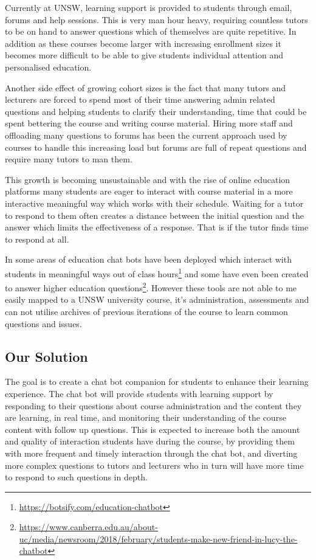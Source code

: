 \documentclass{article}
\begin{document}
Currently at UNSW, learning support is provided to students through email, forums and help sessions. This is very man hour heavy, requiring countless tutors to be on hand to answer questions which of themselves are quite repetitive. In addition as these courses become larger with increasing enrollment sizes it becomes more difficult to be able to give students individual attention and personalised education. 

Another side effect of growing cohort sizes is the fact that many tutors and lecturers are forced to spend most of their time answering admin related questions and helping students to clarify their understanding, time that could be spent bettering the course and writing course material. Hiring more staff and offloading many questions to forums has been the current approach used by courses to handle this increasing load but forums are full of repeat questions and require many tutors to man them. 

This growth is becoming unsustainable and with the rise of online education platforms many students are eager to interact with course material in a more interactive meaningful way which works with their schedule. Waiting for a tutor to respond to them often creates a distance between the initial question and the answer which limits the effectiveness of a response. That is if the tutor finds time to respond at all. 

In some areas of education chat bots have been deployed which interact with students in meaningful ways out of class hours\footnote{\url{https://botsify.com/education-chatbot}} and some have even been created to answer higher education questions\footnote{\url{https://www.canberra.edu.au/about-uc/media/newsroom/2018/february/students-make-new-friend-in-lucy-the-chatbot}}. However these tools are not able to me easily mapped to a UNSW university course, it's administration, assessments and can not utilise archives of previous iterations of the course to learn common questions and issues.


\subsection{Our Solution}

The goal is to create a chat bot companion for students to enhance their learning experience. The chat bot will provide students with learning support by responding to their questions about course administration and the content they are learning, in real time, and monitoring their understanding of the course content with follow up questions. This is expected to increase both the amount and quality of interaction students have during the course, by providing them with more frequent and timely interaction through the chat bot, and diverting more complex questions to tutors and lecturers who in turn will have more time to respond to such questions in depth. 
\end{document}
